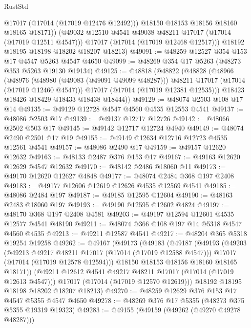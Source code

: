 \begin{lexlean}{RustStd}
\begin{coremodule}
              @17017
              (@17014 (@17019 @12476 @12492)))
            @18150
            @18153
            @18156
            @18160
            @18165
            @18171))
        (@49032 @12510 @4541 @49038 @48211 @17017 (@17014 (@17019 @12511 @4547)))
        @17017
        (@17014 (@17019 @12468 @12517)))
      @18192
      @18195
      @18198
      @18202
      @18207
      @18213)
@49091 := @48259 @12527 @354 @153 @17 @4547 @5263 @4547 @4650
@49099 := @48269 @354 @17 @5263 (@48273 @353 @5263 @19130 @19134)
@49125 := @48818
    (@48822
      (@48828
        (@48966
          (@48976
            (@48980 (@49083 (@49091 @49099 @48287)))
            @48211
            @17017
            (@17014 (@17019 @12460 @4547)))
          @17017
          (@17014 (@17019 @12381 @12535)))
        @18423
        @18426
        @18429
        @18433
        @18438
        @18444))
@49129 := @48074 @2503 @108 @17 @14
@49135 := @49129 @12728 @4547 @4560 @4535 @12553 @4541
@49137 := @48086 @2503 @17
@49139 := @49137 @12717 @12726
@49142 := @48066 @2502 @503 @17
@49145 := @49142 @12717 @12724 @4940
@49149 := @48074 @2490 @2501 @17 @19
@49155 := @49149 @12634 @12716 @12723 @4535 @12561 @4541
@49157 := @48086 @2490 @17
@49159 := @49157 @12620 @12632
@49163 := @48133 @2487 @376 @153 @17
@49167 := @49163 @12620 @12629 @4547 @12632
@49170 := @48142 @2486 @18060 @11
@49173 := @49170 @12620 @12627 @4848
@49177 := @48074 @2484 @368 @197 @2408
@49183 := @49177 @12606 @12619 @12626 @4535 @12569 @4541
@49185 := @48086 @2484 @197
@49187 := @49185 @12595 @12604
@49190 := @48163 @2483 @18060 @197
@49193 := @49190 @12595 @12602 @4824
@49197 := @48170 @368 @197 @2408 @4581
@49203 := @49197 @12594 @12601 @4535 @12577 @4541 @48190
@49211 := @48074 @366 @108 @197 @14 @5318 @4547 @4560 @4535
@49213 := @49211 @12587 @4541
@49217 := @48204 @365 @5318 @19254 @19258
@49262 := @49167
    (@49173
      (@49183
        (@49187
          (@49193
            (@49203
              (@49213 @49217 @48211 @17017 (@17014 (@17019 @12588 @4547)))
              @17017
              (@17014 (@17019 @12578 @12594)))
            @18150
            @18153
            @18156
            @18160
            @18165
            @18171))
        (@49211 @12612 @4541 @49217 @48211 @17017 (@17014 (@17019 @12613 @4547)))
        @17017
        (@17014 (@17019 @12570 @12619)))
      @18192
      @18195
      @18198
      @18202
      @18207
      @18213)
@49270 := @48259 @12629 @376 @153 @17 @4547 @5355 @4547 @4650
@49278 := @48269 @376 @17 @5355 (@48273 @375 @5355 @19319 @19323)
@49283 := @49155 (@49159 (@49262 (@49270 @49278 @48287)))

\end{coremodule}
\end{lexlean}
